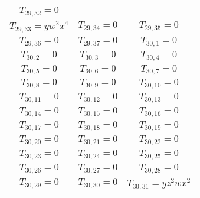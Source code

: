 \begin{longtable}{|c|c|c|}
$T_{29,32}= 0$\\

$T_{29,33}= yw^2x^4$&

$T_{29,34}= 0$&

$T_{29,35}= 0$\\

$T_{29,36}= 0$&

$T_{29,37}= 0$&

$T_{30,1}= 0$\\

$T_{30,2}= 0$&

$T_{30,3}= 0$&

$T_{30,4}= 0$\\

$T_{30,5}= 0$&

$T_{30,6}= 0$&

$T_{30,7}= 0$\\

$T_{30,8}= 0$&

$T_{30,9}= 0$&

$T_{30,10}= 0$\\

$T_{30,11}= 0$&

$T_{30,12}= 0$&

$T_{30,13}= 0$\\

$T_{30,14}= 0$&

$T_{30,15}= 0$&

$T_{30,16}= 0$\\

$T_{30,17}= 0$&

$T_{30,18}= 0$&

$T_{30,19}= 0$\\

$T_{30,20}= 0$&

$T_{30,21}= 0$&

$T_{30,22}= 0$\\

$T_{30,23}= 0$&

$T_{30,24}= 0$&

$T_{30,25}= 0$\\

$T_{30,26}= 0$&

$T_{30,27}= 0$&

$T_{30,28}= 0$\\

$T_{30,29}= 0$&

$T_{30,30}= 0$&

$T_{30,31}= yz^2wx^2$\\


\end{longtable}
